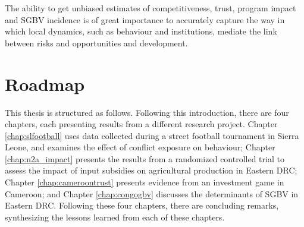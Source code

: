 The ability to get unbiased estimates of competitiveness, trust, program impact and SGBV incidence is of great importance to accurately capture the way in which local dynamics, such as behaviour and institutions, mediate the link between risks and opportunities and development.  

\section{Roadmap}
This thesis is structured as follows. Following this introduction, there are four chapters, each presenting results from a different research project. Chapter \ref{chap:slfootball} uses data collected during a street football tournament in Sierra Leone, and examines the effect of conflict exposure on behaviour; Chapter \ref{chap:n2a_impact} presents the results from a randomized controlled trial to assess the impact of input subsidies on agricultural production in Eastern DRC; Chapter \ref{chap:cameroontrust} presents evidence from an investment game in Cameroon; and Chapter \ref{chap:congogbv} discusses the determinants of SGBV in Eastern DRC. Following these four chapters, there are concluding remarks, synthesizing the lessons learned from each of these chapters.



\clearpage 

